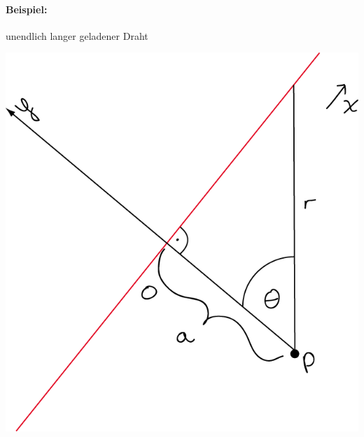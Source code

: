 \documentclass[11pt]{article}
\begin{document}
		\paragraph{Beispiel:} unendlich langer geladener Draht \\
		\begin{center}
			\includegraphics[width=0.5\linewidth]{skizzen/14/14_5B1}
		\end{center}
		
\end{document}
